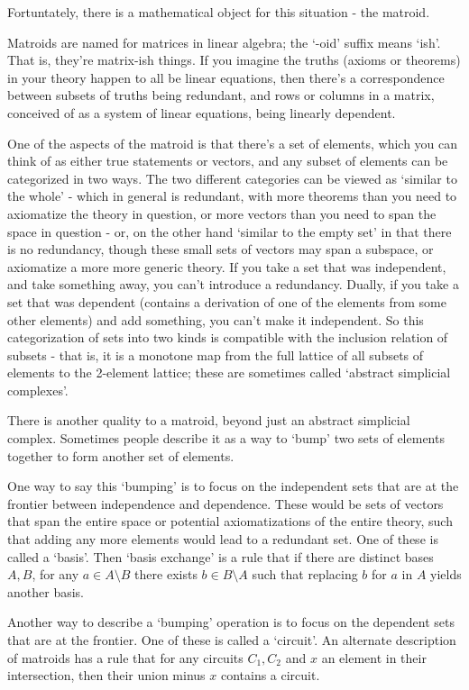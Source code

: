 \documentclass[11pt, noamsfonts]{amsart}
\begin{document}
Fortuntately, there is a mathematical object for this situation - the matroid.

Matroids are named for matrices in linear algebra; the `-oid' suffix means `ish'. That is, they're matrix-ish things. If you imagine the truths (axioms or theorems) in your theory happen to all be linear equations, then there's a correspondence between subsets of truths being redundant, and rows or columns in a matrix, conceived of as a system of linear equations, being linearly dependent.

One of the aspects of the matroid is that there's a set of elements, which you can think of as either true statements or vectors,
and any subset of elements can be categorized in two ways.
The two different categories can be viewed as `similar to the whole' - which in general is redundant, with more theorems than you need to axiomatize the theory in question, or more vectors than you need to span the space in question - or, on the other hand `similar to the empty set' in that there is no redundancy, though these small sets of vectors may span a subspace, or axiomatize a more more generic theory.
If you take a set that was independent, and take something away, you can't introduce a redundancy.
Dually, if you take a set that was dependent (contains a derivation of one of the elements from some other elements) and add something, you can't make it independent.
So this categorization of sets into two kinds is compatible with the inclusion relation of subsets - that is,
it is a monotone map from the full lattice of all subsets of elements to the 2-element lattice; these are sometimes called `abstract simplicial complexes'.

There is another quality to a matroid, beyond just an abstract simplicial complex. Sometimes people describe it as a way to `bump' two sets of elements together to form another set of elements. 

One way to say this `bumping' is to focus on the independent sets that are at the frontier between independence and dependence. These would be sets of vectors that span the entire space or potential axiomatizations of the entire theory, such that adding any more elements would lead to a redundant set. One of these is called a `basis'. Then `basis exchange' is a rule that if there are distinct bases \(A, B\), for any \(a \in A \setminus B\) there exists \(b \in B \setminus A\) such that replacing \(b\) for \(a\) in \(A\) yields another basis.

Another way to describe a `bumping' operation is to focus on the dependent sets that are at the frontier. One of these is called a `circuit'. An alternate description of matroids has a rule that for any circuits \(C_1, C_2\) and \(x\) an element in their intersection, then their union minus \(x\) contains a circuit.
\end{document}
